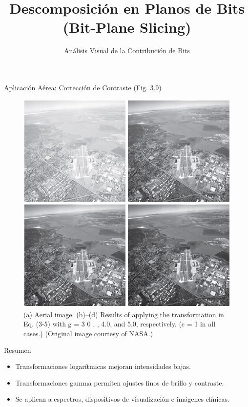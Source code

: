 \documentclass{beamer}
\begin{document}
\begin{frame}{Aplicaci\'on A\'erea: Correcci\'on de Contraste (Fig. 3.9)}
\centering
\begin{figure}
\includegraphics[width=0.5\linewidth]{figuras/Fig_3_9.png}
\caption{(a) Aerial image.
(b)–(d) Results
of applying the
transformation
in Eq. (3-5) with
g = 3 0 . , 4.0, and
5.0, respectively.
(c = 1 in all cases.)
(Original image
courtesy of
NASA.)}
\end{figure}
\end{frame}

\begin{frame}{Resumen}
\begin{itemize}
    \item Transformaciones logar\'itmicas mejoran intensidades bajas.
    \item Transformaciones gamma permiten ajustes finos de brillo y contraste.
    \item Se aplican a espectros, dispositivos de visualizaci\'on e im\'agenes cl\'inicas.
\end{itemize}
\end{frame}


\title{Descomposición en Planos de Bits (Bit-Plane Slicing)}
\subtitle{Análisis Visual de la Contribución de Bits}


\end{document}
